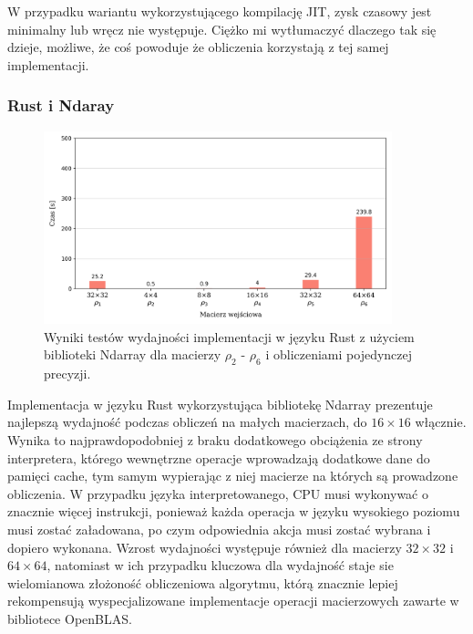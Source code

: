 \documentclass[11pt, a4paper]{article}
\begin{document}
\begin{sloppypar}
    W przypadku wariantu wykorzystującego kompilację JIT, zysk czasowy jest minimalny lub
    wręcz nie występuje. Ciężko mi wytłumaczyć dlaczego tak się dzieje, możliwe, że coś
    powoduje że obliczenia korzystają z tej samej implementacji.

    \subsubsection{ Rust i Ndaray}


    \FloatBarrier
    \begin{figure}[ht]
      \centering
      \includegraphics[width=0.9\textwidth]{"resources/rust_single_tests.png"}
      \caption{Wyniki testów wydajności implementacji w języku Rust z użyciem biblioteki Ndarray dla macierzy $\rho
      _{2}$ - $\rho_{6}$ i obliczeniami pojedynczej precyzji.}
      \label{sp-rust-perf}
    \end{figure}
    \FloatBarrier

    Implementacja w języku Rust wykorzystująca bibliotekę Ndarray prezentuje najlepszą wydajność
    podczas obliczeń na małych macierzach, do $16\times16$ włącznie. Wynika to najprawdopodobniej
    z braku dodatkowego obciążenia ze strony interpretera, którego wewnętrzne operacje
    wprowadzają dodatkowe dane do pamięci cache, tym samym wypierając z niej macierze na
    których są prowadzone obliczenia. W przypadku języka interpretowanego, CPU musi wykonywać
    o znacznie więcej instrukcji, ponieważ każda operacja w języku wysokiego poziomu
    musi zostać załadowana, po czym odpowiednia akcja musi zostać wybrana i dopiero wykonana.
    Wzrost wydajności występuje również dla macierzy $32\times32$ i $64 \times64$, natomiast
    w ich przypadku kluczowa dla wydajność staje sie wielomianowa złożoność obliczeniowa
    algorytmu, którą znacznie lepiej rekompensują wyspecjalizowane implementacje
    operacji macierzowych zawarte w bibliotece OpenBLAS.


\end{sloppypar}
\end{document}

